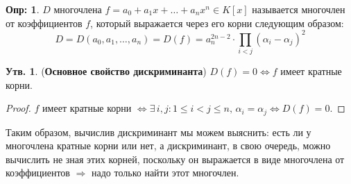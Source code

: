 \documentclass[12pt]{article}
\theoremstyle{definition}
\newtheorem{defn}{Опр:}
\newtheorem{prop}{Утв.}
\begin{document}
\begin{defn}
	 $D$ многочлена $f = a_0 + a_1x + \dotsc + a_n x^n \in K[x]$ называется многочлен от коэффициентов $f$, который выражается через его корни следующим образом:
	$$
		D = D(a_0,a_1,\dotsc, a_n) = D(f) = a_n^{2n-2}{\cdot}\prod\limits_{i< j}(\alpha_i - \alpha_j)^2
	$$
\end{defn}

\newpage
\begin{prop}(\textbf{Основное свойство дискриминанта})
	$D(f) = 0 \Leftrightarrow f$ имеет кратные корни.
\end{prop}
\begin{proof}
	$f$ имеет кратные корни $\Leftrightarrow \exists\, i,j \colon 1\leq i < j\leq n, \, \alpha_i = \alpha_j \Leftrightarrow D(f) = 0$.
\end{proof}
Таким образом, вычислив дискриминант мы можем выяснить: есть ли у многочлена кратные корни или нет, а дискриминант, в свою очередь, можно вычислить не зная этих корней, поскольку он выражается в виде многочлена от коэффициентов $\Rightarrow$ надо только найти этот многочлен.
\end{document}
